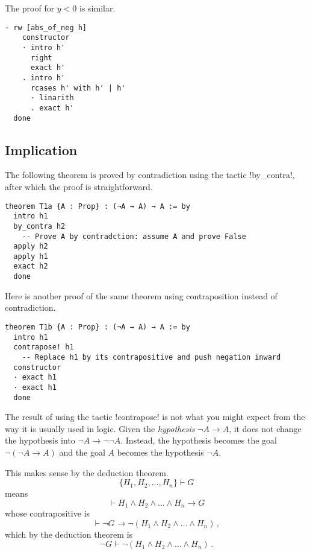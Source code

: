 

The proof for $y< 0$ is similar.
\begin{Verbatim}[firstnumber=last]
  · rw [abs_of_neg h]
    constructor
    · intro h'
      right
      exact h'
    . intro h'
      rcases h' with h' | h'
      · linarith
      . exact h'
  done
\end{Verbatim}

\subsection{Implication}

The following theorem is proved by contradiction using the tactic !by_contra!, after which the proof is straightforward.
\begin{Verbatim}
theorem T1a {A : Prop} : (¬A → A) → A := by
  intro h1
  by_contra h2
    -- Prove A by contradction: assume A and prove False
  apply h2
  apply h1
  exact h2
  done
\end{Verbatim}


\newpage

Here is another proof of the same theorem using contraposition instead of contradiction.
\begin{Verbatim}[firstnumber=last]
theorem T1b {A : Prop} : (¬A → A) → A := by
  intro h1
  contrapose! h1
    -- Replace h1 by its contrapositive and push negation inward
  constructor
  · exact h1
  · exact h1
  done
\end{Verbatim}

The result of using the tactic !contrapose! is not what you might expect from the way it is usually used in logic. Given the \emph{hypothesis} $\neg A \rightarrow A$, it does not change the hypothesis into $\neg A \rightarrow \neg\neg A$. Instead, the hypothesis becomes the goal $\neg(\neg A \rightarrow A)$ and the goal $A$ becomes the hypothesis $\neg A$.

This makes sense by the deduction theorem.
\[
\{H_1, H_2, \ldots, H_n\} \vdash G 
\]
means 
\[
\vdash H_1\wedge H_2 \wedge \ldots \wedge H_n \rightarrow G
\]
whose contrapositive is
\[
\vdash \neg G \rightarrow \neg (H_1\wedge H_2 \wedge \ldots \wedge H_n)\,,
\]
which by the deduction theorem is
\[
\neg G \vdash \neg (H_1\wedge H_2 \wedge \ldots \wedge H_n)\,.
\]

